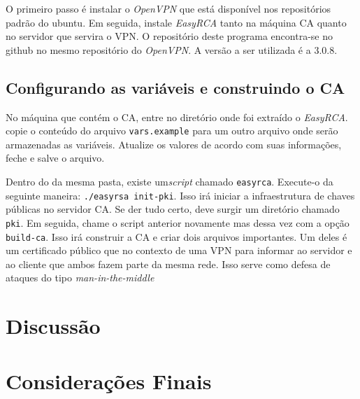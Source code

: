 \documentclass[12pt]{article}
\begin{document}
O primeiro passo é instalar o \emph{OpenVPN} que está disponível nos repositórios padrão do ubuntu.
Em seguida, instale \emph{EasyRCA} tanto na máquina CA quanto no servidor que servira o VPN.
O repositório deste programa encontra-se no github no mesmo repositório do \emph{OpenVPN}. 
A versão a ser utilizada é a 3.0.8.

\subsection{Configurando as variáveis e construindo o CA}

No máquina que contém o CA, entre no diretório onde foi extraído o \emph{EasyRCA}. copie o conteúdo
do arquivo \texttt{vars.example} para um outro arquivo onde serão armazenadas as variáveis. Atualize
os valores de acordo com suas informações, feche e salve o arquivo. 

Dentro do da mesma pasta, existe um\emph{script} chamado \texttt{easyrca}. Execute-o da seguinte
maneira: \texttt{./easyrsa init-pki}. Isso irá iniciar a infraestrutura de chaves públicas no servidor CA.
Se der tudo certo, deve surgir um diretório chamado \texttt{pki}. Em seguida, chame o script anterior 
novamente mas dessa vez com a opção \texttt{build-ca}. Isso irá construir a CA e criar
dois arquivos importantes. Um deles é um certificado público que no contexto de uma VPN para informar
ao servidor e ao cliente que ambos fazem parte da mesma rede. Isso serve como defesa de ataques 
do tipo \emph{man-in-the-middle} 



\section{Discussão}


\section{Considerações Finais}


\end{document}
